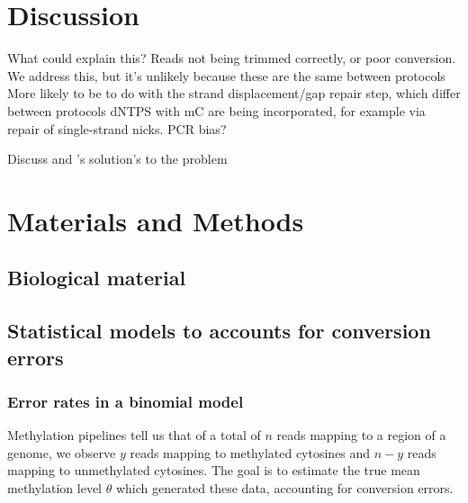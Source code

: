 \documentclass[12pt,longbibliography]{article}
\begin{document}
\section{Discussion}


What could explain this?
Reads not being trimmed correctly, or poor conversion.
We address this, but it's unlikely because these are the same between protocols
More likely to be to do with the strand displacement/gap repair step, which differ between protocols
dNTPS with mC are being incorporated, for example via repair of single-strand nicks.
PCR bias?


Discuss \cite{lu2015improved} and \cite{suzuki2018whole}'s solution's to the problem

\section{Materials and Methods}

\subsection{Biological material}

\subsection{Statistical models to accounts for conversion errors}

\subsubsection{Error rates in a binomial model}

Methylation pipelines tell us that of a total of $n$ reads mapping to a region of a genome, we observe $y$ reads mapping to methylated cytosines and $n-y$ reads mapping to unmethylated cytosines. The goal is to estimate the true mean methylation level $\theta$ which generated these data, accounting for conversion errors.
\end{document}
